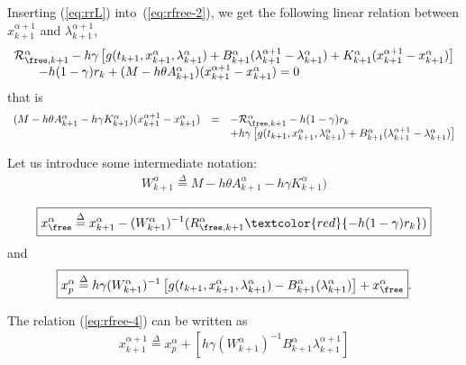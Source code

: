Inserting (\ref{eq:rrL}) into~(\ref{eq:rfree-2}), we get the following linear relation between $x^{\alpha+1}_{k+1}$ and
$\lambda^{\alpha+1}_{k+1}$, 
\begin{equation}
  \label{eq:rfree-3}
  \begin{array}{l}
  \mathcal R^{\alpha}_{\free, k+1}  - h\gamma\left[  g(t_{k+1},x^{\alpha}_{k+1},\lambda^{\alpha}_{k+1}) +
    B^{\alpha}_{k+1} (\lambda^{\alpha+1}_{k+1} - \lambda^{\alpha}_{k+1})+K^{\alpha}_{k+1}
    (x^{\alpha+1}_{k+1} - x^{\alpha}_{k+1})  \right] \\
  \quad\quad - h(1-\gamma)r_k  + (M-h\theta A^{\alpha}_{k+1}) (x^{\alpha+1}_{k+1} -
    x^{\alpha}_{k+1})  =0
  \end{array}
\end{equation}
that is
\begin{equation}
  \label{eq:rfree-4}
  \begin{array}[l]{lcl}
  (M-h\theta A^{\alpha}_{k+1}-h\gamma K^{\alpha}_{k+1}) (x^{\alpha+1}_{k+1}  -  x^{\alpha}_{k+1}) &=& 
  -  \mathcal R^{\alpha}_{\free, k+1} -h(1-\gamma) r_k \\ & & + h\gamma \left[  g(t_{k+1},x^{\alpha}_{k+1},\lambda^{\alpha}_{k+1}) +
    B^{\alpha}_{k+1} (\lambda^{\alpha+1}_{k+1} - \lambda^{\alpha}_{k+1})  \right]  
\end{array}
\end{equation}

Let us introduce some intermediate notation:
\begin{equation}
   \label{eq:NL9}
   \begin{array}{l}
     W^{\alpha}_{k+1} \stackrel{\Delta}{=} M-h\theta A^{\alpha}_{k+1}-h\gamma K^{\alpha}_{k+1})\\
   \end{array}
 \end{equation}
 \begin{equation}
   \label{eq:rfree-12}
   \boxed{x^\alpha_{\free}\stackrel{\Delta}{=}x^{\alpha}_{k+1}-(W^{\alpha}_{k+1})^{-1}\mathcal (R_{\free,k+1}^{\alpha} \textcolor{red}{- h(1-\gamma) r_k})}
 \end{equation}
and 
\begin{equation}
  \boxed{x^\alpha_p \stackrel{\Delta}{=}  h\gamma(W^{\alpha}_{k+1} )^{-1}\left[g(t_{k+1},x^{\alpha}_{k+1},\lambda^{\alpha}_{k+1}) 
    -B^{\alpha}_{k+1} (\lambda^{\alpha}_{k+1}) \right ] +x^\alpha_{\free}}.
\end{equation}

The relation (\ref{eq:rfree-4}) can be written as
\begin{equation}
  \label{eq:rfree-13}
  \begin{array}{l}
    \boxed{   x^{\alpha+1}_{k+1}\stackrel{\Delta}{=}  x^\alpha_p +  \left[ h \gamma (W^{\alpha}_{k+1})^{-1}    B^{\alpha}_{k+1} \lambda^{\alpha+1}_{k+1}\right]}
   \end{array}
\end{equation}



